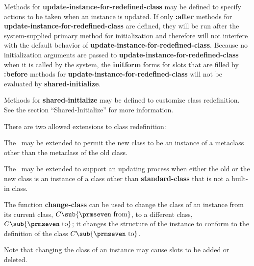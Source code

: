 \endsubSection%


Methods for {\bf update-instance-for-redefined-class} may be defined
to specify actions to be taken when an instance is updated.  If only
{\bf :after} methods for {\bf update-instance-for-redefined-class} are
defined, they will be run after the system-supplied primary method for
initialization and therefore will not interfere with the default
behavior of {\bf update-instance-for-redefined-class}.  Because no
initialization arguments are passed to {\bf
update-instance-for-redefined-class} when it is called by the system,
the {\bf initform} forms for slots that are filled by {\bf :before}
methods for {\bf update-instance-for-redefined-class} will not be
evaluated by {\bf shared-initialize}.

\vfill\eject
Methods for {\bf shared-initialize} may be defined to customize class
redefinition.  See the section ``Shared-Initialize'' for more
information.

\endsubSection%


There are two allowed extensions to class redefinition: 

\beginlist

\item{\bull} The \OS\ may be extended to permit the new class
to be an instance of a metaclass other than the metaclass of the
old class.

\item{\bull} The \OS\ may be extended to support an updating process
when either the old or the new class is an instance of a
class other than {\bf standard-class} that is not a built-in class.

\endlist

\endsubSection%

\endSection%


The function {\bf change-class} can be used to change the class of an
instance from its current class, $C\sub {\hbox{{\prmseven from}}}$, to a
different class, $C\sub {\hbox{{\prmseven to}}}$; it changes the
structure of the instance to conform to the definition of the class
$C\sub {\hbox{{\prmseven to}}}$.

Note that changing the class of an instance may cause slots to be
added or deleted. 

